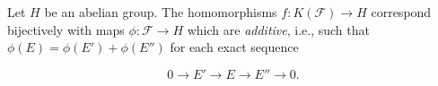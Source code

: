 Let $H$ be an abelian group. The homomorphisms $f: K(\mathcal{F}) \to H$ correspond bijectively with maps $\phi: \mathcal{F} \to H$ which are \emph{additive}, i.e., such that $\phi(E) = \phi(E') + \phi(E'')$ for each exact sequence

$$0 \to E' \to E \to E'' \to 0.$$
